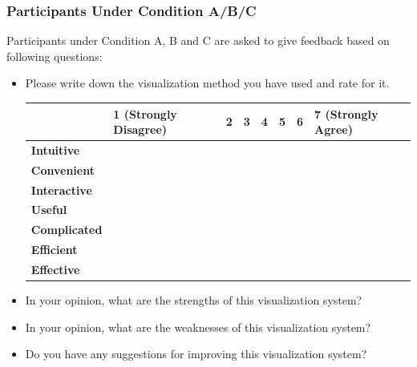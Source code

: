 \subsubsection{Participants Under Condition A/B/C}
Participants under Condition A, B and C are asked to give feedback based on following questions:
\begin{itemize}
	\item Please write down the visualization method you have used and rate for it.
	\begin{center}
		\begin{tabular}{ | l | l | l | l | l | l | l | l | }
			\hline
			                     & 1 (Strongly Disagree) & 2 & 3 & 4 & 5 & 6 & 7 (Strongly Agree) \\ \hline
			\textbf{Intuitive}   &                       &   &   &   &   &   &                    \\ \hline
			\textbf{Convenient}  &                       &   &   &   &   &   &                    \\ \hline
			\textbf{Interactive} &                       &   &   &   &   &   &                    \\ \hline
			\textbf{Useful}      &                       &   &   &   &   &   &                    \\ \hline
			\textbf{Complicated} &                       &   &   &   &   &   &                    \\ \hline
			\textbf{Efficient}   &                       &   &   &   &   &   &                    \\ \hline
			\textbf{Effective}   &                       &   &   &   &   &   &                    \\ \hline
		\end{tabular}
	\end{center}
\item In your opinion, what are the strengths of this visualization system?
\item In your opinion, what are the weaknesses of this visualization system?
\item Do you have any suggestions for improving this visualization system?
\end{itemize}

